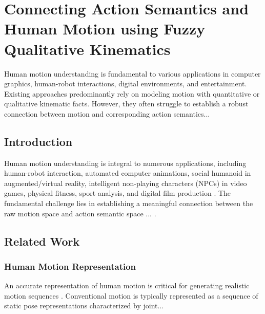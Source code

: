 %
%
%
%
%

\chapter{Connecting Action Semantics and Human Motion using Fuzzy Qualitative Kinematics}

Human motion understanding is fundamental to various applications in computer graphics, human-robot interactions, digital environments, and entertainment. Existing approaches predominantly rely on modeling motion with quantitative or qualitative kinematic facts. However, they often struggle to establish a robust connection between motion and corresponding action semantics...

\section{Introduction}
Human motion understanding is integral to numerous applications, including human-robot interaction, automated computer animations, social humanoid in augmented/virtual reality, intelligent non-playing characters (NPCs) in video games, physical fitness, sport analysis, and digital film production \cite{fg-t2m, act-recog, assist-walk}. The fundamental challenge lies in establishing a meaningful connection between the raw motion space and action semantic space ...
.

\section{Related Work}
\subsection{Human Motion Representation} 
An accurate representation of human motion is critical for generating realistic motion sequences \cite{motion-synthesis-survey}. Conventional motion is typically represented as a sequence of static pose representations characterized by joint...

